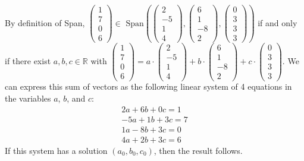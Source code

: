 \documentclass[12pt]{article}
\newenvironment{problem}[2][Problem]
{
	\begin{trivlist} 
		\item[\hskip \labelsep {\bfseries #1 #2:}]
	}
{
	\end{trivlist}
	}
\newenvironment{solution}[1][Solution]
{
	\begin{trivlist} 
		\item[\hskip \labelsep {\itshape #1:}]
	}
	{
	\end{trivlist}
}
\begin{document}
\begin{problem}{2}
\begin{solution}
By definition of Span, $\begin{pmatrix} 1\\7\\0\\6\end{pmatrix} \in \text{ Span}\left( \begin{pmatrix} 2\\-5\\1\\4 \end{pmatrix}, \begin{pmatrix} 6\\1\\-8\\2 \end{pmatrix}, \begin{pmatrix} 0\\3\\3\\3 \end{pmatrix} \right)$ if and only if there exist $a,b,c \in \mathbb{R}$ with $\begin{pmatrix} 1\\7\\0\\6\end{pmatrix} = a\cdot \begin{pmatrix} 2\\-5\\1\\4 \end{pmatrix} + b\cdot \begin{pmatrix} 6\\1\\-8\\2 \end{pmatrix} + c\cdot \begin{pmatrix} 0\\3\\3\\3 \end{pmatrix}$. We can express this sum of vectors as the following linear system of 4 equations in the variables $a$, $b$, and $c$:
\begin{align*}
2a + 6b + 0c = 1\\
-5a+1b+3c=7\\
1a-8b+3c=0\\
4a+2b+3c=6
\end{align*}
If this system has a solution $(a_0,b_0,c_0)$, then the result follows.
\end{solution}
\end{problem}
\end{document}

